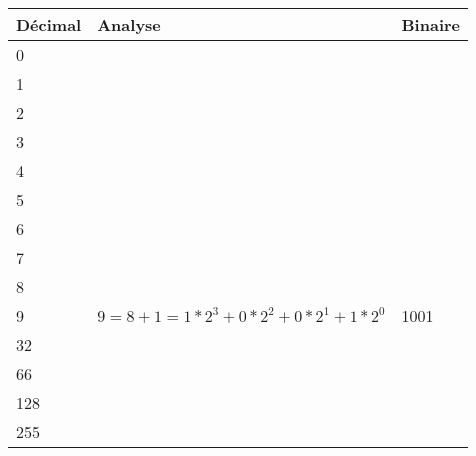 \begin{tabular}{p{2cm}|p{10cm}|p{2cm}}
Décimal		&Analyse	&Binaire\\
\hline
0		&		&	\\
\hline
1		&		&	\\
\hline
2		&		&	\\
\hline
3		&		&	\\
\hline
4		&		&	\\
\hline
5		&		&	\\
\hline
6		&		&	\\
\hline
7		&		&	\\
\hline
8		&		&	\\
\hline
9		&$9=8+1 = 1*2^3 + 0*2^2 + 0*2^1 + 1*2^0$		&1001	\\
\hline
32		&		&	\\
\hline
66		&		&	\\
\hline
128		&		&	\\
\hline
255		&		&	\\
\end{tabular}
